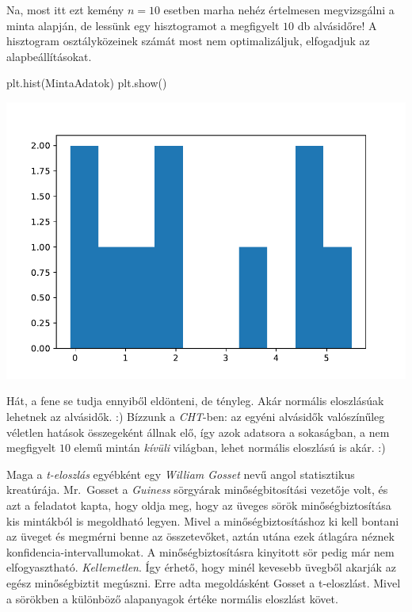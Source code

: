 \documentclass[
]{book}
\newenvironment{Shaded}{\begin{snugshade}}{\end{snugshade}}
\newcommand{\NormalTok}[1]{#1}
\begin{document}
Na, most itt ezt kemény \(n=10\) esetben marha nehéz értelmesen megvizsgálni a minta alapján, de lessünk egy hisztogramot a megfigyelt \(10\) db alvásidőre! A hisztogram osztályközeinek számát most nem optimalizáljuk, elfogadjuk az alapbeállításokat.

\begin{Shaded}
\begin{Highlighting}[]
\NormalTok{plt.hist(MintaAdatok)}
\NormalTok{plt.show()}
\end{Highlighting}
\end{Shaded}

\includegraphics{_main_files/figure-latex/unnamed-chunk-271-9.pdf}

Hát, a fene se tudja ennyiből eldönteni, de tényleg. Akár normális eloszlásúak lehetnek az alvásidők. :) Bízzunk a \emph{CHT}-ben: az egyéni alvásidők valószínűleg véletlen hatások összegeként állnak elő, így azok adatsora a sokaságban, a nem megfigyelt \(10\) elemű mintán \emph{kívüli} világban, lehet normális eloszlású is akár. :)

Maga a \emph{t-eloszlás} egyébként egy \emph{William Gosset} nevű angol statisztikus kreatúrája. Mr.~Gosset a \emph{Guiness} sörgyárak minőségbitosítási vezetője volt, és azt a feladatot kapta, hogy oldja meg, hogy az üveges sörök minőségbiztosítása kis mintákból is megoldható legyen. Mivel a minőségbiztosításhoz ki kell bontani az üveget és megmérni benne az összetevőket, aztán utána ezek átlagára néznek konfidencia-intervallumokat. A minőségbiztosításra kinyitott sör pedig már nem elfogyasztható. \emph{Kellemetlen}.
Így érhető, hogy minél kevesebb üvegből akarják az egész minőségbiztit megúszni. Erre adta megoldásként Gosset a t-eloszlást. Mivel a sörökben a különböző alapanyagok értéke normális eloszlást követ.
\end{document}

